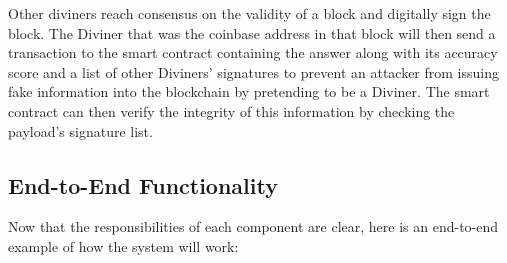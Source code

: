 \documentclass{article}
\begin{document}
Other diviners reach consensus on the validity of a block and digitally sign the block. The Diviner that was the coinbase address in that block will then send a transaction to the smart contract containing the answer along with its accuracy score and a list of other Diviners' signatures to prevent an attacker from issuing fake information into the blockchain by pretending to be a Diviner. The smart contract can then verify the integrity of this information by checking the payload's signature list.

\subsection{End-to-End Functionality}

Now that the responsibilities of each component are clear, here is an end-to-end example of how the system will work:
\end{document}
